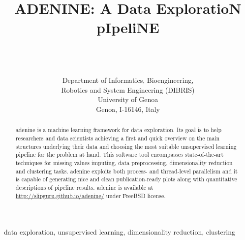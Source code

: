 \documentclass[twoside,11pt]{article}
\makeatletter
\newcommand{\ade}{{\sc adenine}\@\xspace}
\makeatother
\begin{document}
\title{{\sc ADENINE: A Data ExploratioN pIpeliNE}}

\author{ \\
         \\
         \\[1em]
        \addr Department of Informatics, Bioengineering, \\Robotics and System    Engineering (DIBRIS)\\
        University of Genoa\\
        Genoa, I-16146, Italy}



\maketitle

\begin{abstract}%
    \ade is a machine learning framework for data exploration.
    Its goal is to help researchers and data scientists achieving a first and quick overview on the main structures underlying their data and choosing the most suitable unsupervised learning pipeline for the problem at hand.
    This software tool encompasses state-of-the-art techniques for missing values imputing, data preprocessing, dimensionality reduction and clustering tasks.
    \ade exploits both process- and thread-level parallelism and it is capable of generating nice and clean publication-ready plots along with quantitative descriptions of pipeline results. \ade is available at \mbox{\small\url{http://slipguru.github.io/adenine/}} under FreeBSD license.
\end{abstract}

\begin{keywords}
    data exploration, unsupervised learning, dimensionality reduction, clustering
\end{keywords}
\end{document}
